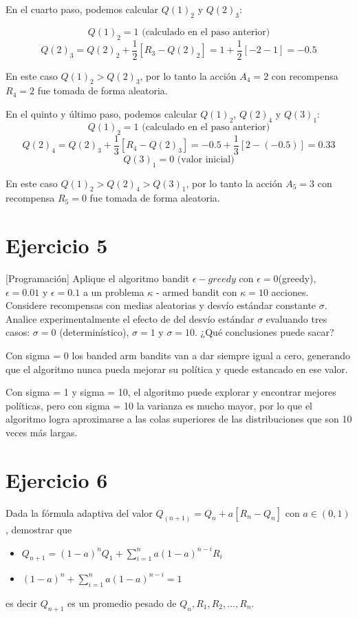 \documentclass[12pt,a4paper]{article}
\begin{document}
En el cuarto paso, podemos calcular $Q(1)_2$ y $Q(2)_3$:

$$ Q(1)_2 = 1 \text{ (calculado en el paso anterior)} $$
$$ Q(2)_3 = Q(2)_2 + \frac{1}{2}[R_3 - Q(2)_2] = 1 + \frac{1}{2}[-2 - 1] = -0.5 $$

En este caso $Q(1)_2 > Q(2)_3$, por lo tanto la acción $A_4=2$ con recompensa $R_4=2$
fue tomada de forma aleatoria.

En el quinto y último paso, podemos calcular $Q(1)_2$, $Q(2)_4$ y $Q(3)_1$:
$$ Q(1)_2 = 1 \text{ (calculado en el paso anterior)} $$
$$ Q(2)_4 = Q(2)_3 + \frac{1}{3}[R_4 - Q(2)_3] = -0.5 + \frac{1}{3}[2 - (-0.5)] = 0.33 $$
$$ Q(3)_1 = 0 \text{ (valor inicial)} $$

En este caso $Q(1)_2 > Q(2)_4 > Q(3)_1$, por lo tanto la acción $A_5=3$ con recompensa $R_5=0$
fue tomada de forma aleatoria.

\section{Ejercicio 5} %

[Programación] Aplique el algoritmo bandit $\epsilon - greedy$ con $\epsilon=0 $(greedy), 
$\epsilon=0.01$ y $\epsilon=0.1$ a un problema $\kappa$ - armed bandit con $\kappa=10$ acciones. Considere recompensas con medias 
aleatorias y desvío estándar constante $\sigma$. Analice experimentalmente el efecto de del desvío 
estándar $\sigma$ evaluando tres casos: $\sigma =0$ (determinístico), 
$\sigma =1$ y $\sigma =10$. ¿Qué conclusiones puede sacar?

Con sigma = 0 los banded arm bandits van a dar siempre igual a cero,
generando que el algoritmo nunca pueda mejorar su política y quede estancado
en ese valor.

Con sigma = 1 y sigma = 10, el algoritmo puede explorar y encontrar
mejores políticas, pero con sigma = 10 la varianza es mucho mayor,
por lo que el algoritmo logra aproximarse a las colas superiores de las
distribuciones que son 10 veces más largas.


\section{Ejercicio 6}

Dada la fórmula adaptiva del valor $Q_(n+1) = Q_n + a[R_n - Q_n]$ con $a \in (0,1)$,
demostrar que
\begin{itemize}
\item $Q_{n+1} = (1-a)^n Q_1 + \sum_{i=1}^{n} a(1-a)^{n-i}R_i$
\item $(1-a)^n+ \sum_{i=1}^{n} a(1-a)^{n-i} = 1$
\end{itemize}
es decir $Q_{n+1}$ es un promedio pesado de $Q_n,R_1,R_2,...,R_n$.
\end{document}
